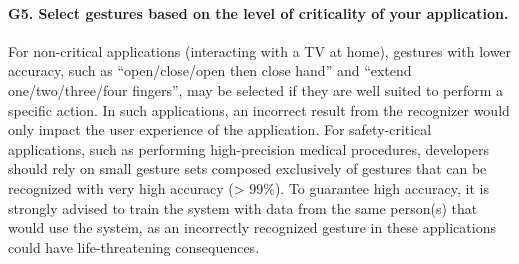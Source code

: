\paragraph{G5. Select gestures based on the level of criticality of your application.}
For non-critical applications (\eg interacting with a TV at home), gestures with lower accuracy, such as ``open/close/open then close hand'' and ``extend one/two/three/four fingers'', may be selected if they are well suited to perform a specific action. In such applications, an incorrect result from the recognizer would only impact the user experience of the application.
%
For safety-critical applications, such as performing high-precision medical procedures, developers should rely on small gesture sets composed exclusively of gestures that can be recognized with very high accuracy (> 99\%). To guarantee high accuracy, it is strongly advised to train the system with data from the same person(s) that would use the system, as an incorrectly recognized gesture in these applications could have life-threatening consequences. 
    
    
    

